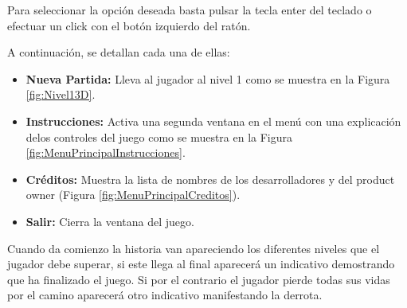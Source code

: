 Para seleccionar la opción deseada basta pulsar la tecla enter del teclado o efectuar un click con el botón izquierdo del ratón.

A continuación, se detallan cada una de ellas: 
\begin{itemize}
	\item \textbf{Nueva Partida:} Lleva al jugador al nivel 1 como se muestra en la Figura \ref{fig:Nivel13D}.	
	\item \textbf{Instrucciones:} Activa una segunda ventana en el menú con una explicación delos controles del juego como se muestra en la Figura \ref{fig:MenuPrincipalInstrucciones}.
	\item \textbf{Créditos:} Muestra la lista de nombres de los desarrolladores y del product owner (Figura \ref{fig:MenuPrincipalCreditos}).  
	\item \textbf{Salir:} Cierra la ventana del juego. 
\end{itemize}

Cuando da comienzo la historia van apareciendo los diferentes niveles que el jugador debe superar, si este llega al final aparecerá un indicativo demostrando que ha finalizado el juego. Si por el contrario el jugador pierde todas sus vidas por el camino aparecerá otro indicativo manifestando la derrota. 